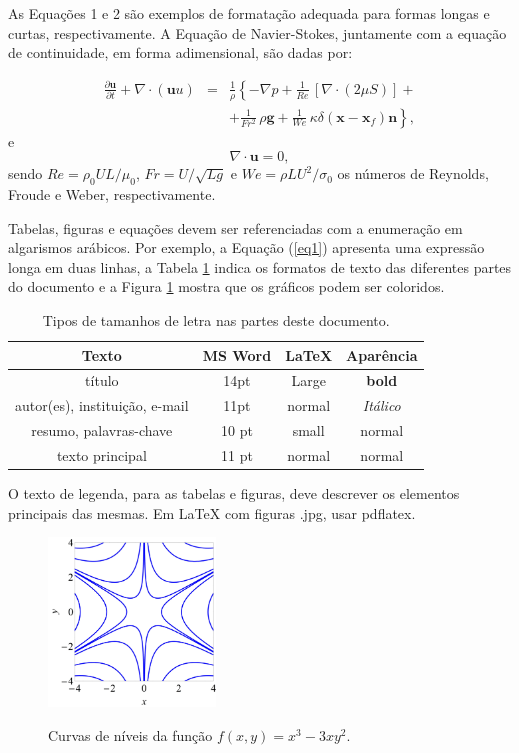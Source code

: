 \documentclass[a4paper,11pt]{article}
\begin{document}
{As Equações 1 e 2 são exemplos de formatação adequada para formas longas e curtas, respectivamente. A Equação de Navier-Stokes, juntamente com a equação de continuidade, em forma adimensional, são dadas por:

\begin{eqnarray}
\nonumber
\frac{\partial {\mathbf u}}{\partial t} + \nabla \cdot ({\mathbf uu}) &=& \frac{1}{\rho}\left\{-\nabla p + \frac{1}{Re}\,[\nabla \cdot (2 \mu S)] +\right.
\\
&& \left.+\frac{1}{Fr^2}\,\rho {\mathbf g} +
\frac{1}{We}\,\kappa \delta ({\mathbf x} - {\mathbf x}_f) {\mathbf n}\right\},
\label{eq1}
\end{eqnarray}
e
\begin{equation}
\nabla \cdot {\mathbf u} = 0,
\label{eq2}
\end{equation}
\normalsize
sendo $Re = \rho_{0}UL/ \mu_{0}$, $Fr = U/ \sqrt{Lg}$ e $We = \rho L U^2 /\sigma_{0}$ os números de Reynolds, Froude e Weber, respectivamente.

Tabelas, figuras e equações devem ser referenciadas com a enumeração em algarismos arábicos. Por exemplo, a Equação (\ref{eq1}) apresenta uma expressão longa em duas linhas, a Tabela \ref{fonts} indica os formatos de texto das diferentes partes do documento e a Figura \ref{niveis} mostra que os gráficos podem ser coloridos.


\begin{table}[h]
\caption{{\small Tipos de tamanhos de letra nas partes deste documento.}}\label{fonts}
\centering
\begin{tabular}{|c|c|c|c|}
\hline
{\bf Texto} & {\bf MS Word} & {\bf LaTeX} & {\bf Aparência} \\
\hline
título & 14pt & Large & \textbf{bold}\\
autor(es), instituição, e-mail & 11pt & normal & \textit{Itálico}\\
resumo, palavras-chave  &	10 pt	 & small  &	{\small normal}\\
texto principal	 &11 pt & normal & normal\\
\hline
\end{tabular}
\end{table}

O texto de legenda, para as tabelas e figuras, deve descrever os elementos principais das mesmas. Em LaTeX com figuras .jpg, usar pdflatex.

\begin{figure}[h]
\centering \includegraphics[height=4.5cm]{fig.jpg}\\
\caption{{\small Curvas de níveis da função $f(x,y)=x^3-3 x y^2$. }}
\label{niveis}
\end{figure}

}
\end{document}

